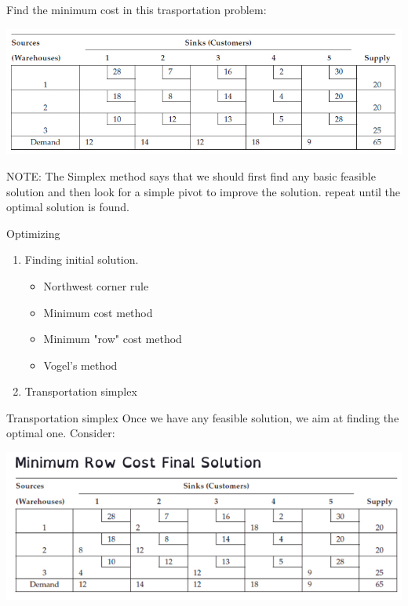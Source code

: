 \documentclass[c]{beamer}
\begin{document}
\begin{frame}
\begin{Exercise}
  Find the minimum cost in this trasportation problem:
  \begin{center}
    \includegraphics[width=\linewidth]{../figures/transportationproblem2.png}
  \end{center}
  NOTE: The Simplex method says that we should first find any basic feasible solution and then look for a simple pivot to improve the solution. repeat until the optimal solution is found.
\end{Exercise}
\end{frame}

\begin{frame}{Optimizing}
\begin{enumerate}
  \item Finding initial solution.
  \begin{itemize}
  \item Northwest corner rule
  \item Minimum cost method
  \item Minimum "row" cost method
  \item Vogel's method
  \end{itemize}
  \item Transportation simplex
\end{enumerate}
\end{frame}

\begin{frame}{Transportation simplex}
  Once we have any feasible solution, we aim at finding the optimal one. Consider:
  \begin{center}
    \includegraphics[width=\linewidth]{../figures/transportationproblem3.png}
  \end{center}

\end{frame}
\end{document}
